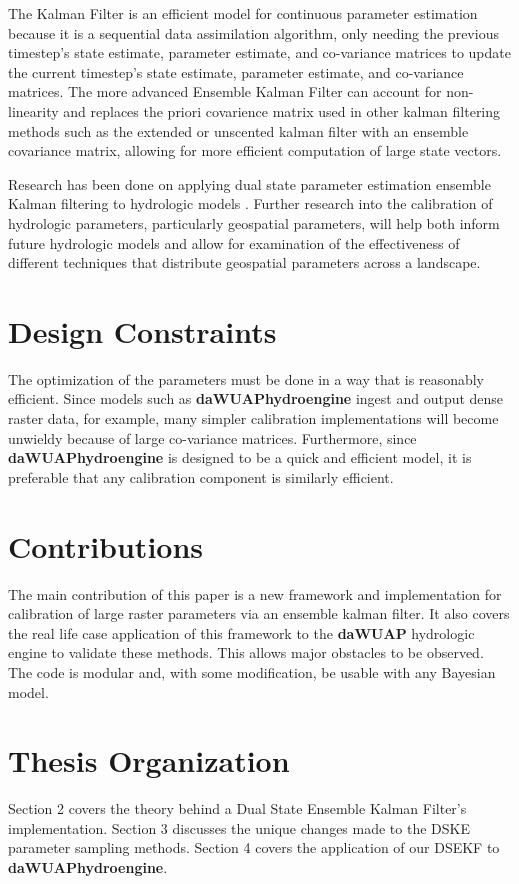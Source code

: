 The Kalman Filter is an efficient model for continuous parameter estimation because it is a sequential data assimilation algorithm, only needing the previous timestep's state estimate, parameter estimate, and co-variance matrices to update the current timestep's state estimate, parameter estimate, and co-variance matrices. The more advanced Ensemble Kalman Filter can account for non-linearity and replaces the priori covarience matrix used in other kalman filtering methods such as the extended or unscented kalman filter with an ensemble covariance matrix, allowing for more efficient computation  of large state vectors.

Research has been done on applying dual state parameter estimation ensemble Kalman filtering to hydrologic models \cite{Moradkhani2005}. Further research into the calibration of hydrologic parameters, particularly geospatial parameters, will help both inform future hydrologic models and allow for examination of the effectiveness of different  techniques that distribute geospatial parameters across a landscape.

\section{Design Constraints}

The optimization of the parameters must be done in a way that is reasonably efficient. Since models such as \textbf{daWUAPhydroengine} ingest and output dense raster data, for example, many simpler calibration implementations will become unwieldy because of large co-variance matrices. Furthermore, since \textbf{daWUAPhydroengine} is designed to be a quick and efficient model, it is preferable that any calibration component is similarly efficient.


\section{Contributions}

The main contribution of this paper is a new framework and implementation for calibration of large raster parameters via an ensemble kalman filter. It also covers the real life case application of this framework to the \textbf{daWUAP} hydrologic engine to validate these methods. This allows major obstacles to be observed. The code is modular and, with some modification, be usable with any Bayesian model.

\section{Thesis Organization}

Section 2 covers the theory behind a Dual State Ensemble Kalman Filter's implementation. Section 3 discusses the unique changes made to the DSKE parameter sampling methods. Section 4 covers the application of our DSEKF to \textbf{daWUAPhydroengine}.


